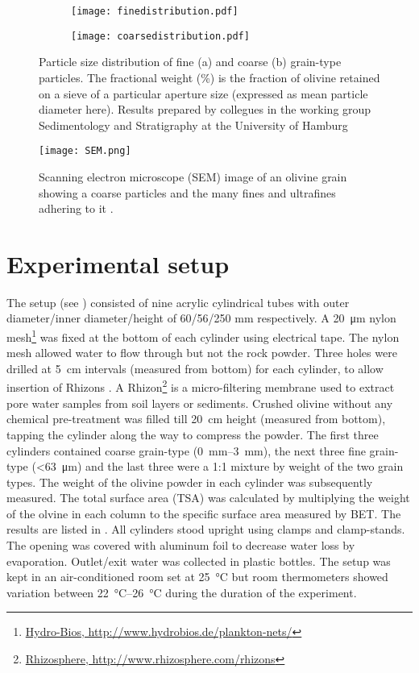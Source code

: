 \begin{figure}
\begin{subfigure}{.5\textwidth}
  \centering
  \texttt{[image: finedistribution.pdf]}
  \caption{}
   \label{fig:finepsd}
\end{subfigure}%
\begin{subfigure}{.5\textwidth}
  \centering
  \texttt{[image: coarsedistribution.pdf]}
  \caption{}
    \label{fig:coarsepsd}
\end{subfigure}
\caption{Particle size distribution of fine (a) and coarse (b) grain-type particles. The fractional weight (\si{\percent}) is the fraction of olivine retained on a sieve of a particular aperture size (expressed as mean particle diameter here). Results prepared by collegues in the working group Sedimentology and Stratigraphy at the University of Hamburg}
\end{figure}
\begin{figure}[H]
\centering
  \texttt{[image: SEM.png]}
  \caption{Scanning electron microscope (SEM) image of an olivine grain showing a coarse particles and the many fines and ultrafines adhering to it \citep{marvin}.}
  \label{fig:SEM}
 \end{figure}
\section{Experimental setup}
The setup (see ) consisted of nine acrylic cylindrical tubes with outer diameter/inner diameter/height of 60/56/250 \si{mm} respectively. A \SI{20}{\micro\meter} nylon mesh\footnote{\url{Hydro-Bios, http://www.hydrobios.de/plankton-nets/}} was fixed at the bottom of each cylinder using electrical tape. The nylon mesh allowed water to flow through but not the rock powder. Three holes were drilled at \SI{5}{cm} intervals (measured from bottom) for each cylinder, to allow insertion of Rhizons . A Rhizon\footnote{\url{Rhizosphere, http://www.rhizosphere.com/rhizons}} is a micro-filtering membrane used to extract pore water samples from soil layers or sediments.  Crushed olivine without any chemical pre-treatment was filled till \SI{20}{cm} height (measured from bottom), tapping the cylinder along the way to compress the powder. The first three cylinders contained coarse grain-type (\SIrange[range-units = single,range-phrase = --]{0}{3}{\milli\metre}), the next three fine grain-type (\SI{<63}{\micro\meter}) and the last three were a 1:1 mixture by weight of the two grain types. The weight of the olivine powder in each cylinder was subsequently measured. The total surface area (TSA) was calculated by multiplying the weight of the olvine in each column to the specific surface area measured by BET. The results are listed in . All cylinders stood upright using clamps and clamp-stands. The opening was covered with aluminum foil to decrease water loss by evaporation. Outlet/exit water was collected in plastic bottles. The setup was kept in an air-conditioned room set at \SI{25}{\degreeCelsius} but room thermometers showed variation between \SIrange[range-units = single,range-phrase = --]{22}{26}{\degreeCelsius} during the duration of the experiment.

